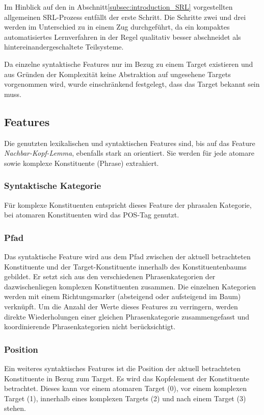 \documentclass[12pt]{article}
\begin{document}
Im Hinblick auf den in Abschnitt\ref{subsec:introduction_SRL} vorgestellten allgemeinen SRL-Prozess entfällt der erste Schritt. Die Schritte zwei und drei werden im Unterschied zu \cite{gildea} in einem Zug durchgeführt, da ein kompaktes automatisiertes Lernverfahren in der Regel qualitativ besser abschneidet als hintereinandergeschaltete Teilsysteme.

Da einzelne syntaktische Features nur im Bezug zu einem Target existieren und aus Gründen der Komplexität keine Abstraktion auf ungesehene Targets vorgenommen wird, wurde einschränkend festgelegt, dass das Target bekannt sein muss.

\subsection{Features}
Die genutzten lexikalischen und syntaktischen Features sind, bis auf das Feature \textit{Nachbar-Kopf-Lemma}, ebenfalls stark an \cite{gildea} orientiert. Sie werden für jede atomare sowie komplexe Konstituente (Phrase) extrahiert.

\subsubsection*{Syntaktische Kategorie}
Für komplexe Konstituenten entspricht dieses Feature der phrasalen Kategorie, bei atomaren Konstituenten wird das POS-Tag genutzt.
\subsubsection*{Pfad}
Das syntaktische Feature wird aus dem Pfad zwischen der aktuell betrachteten Konstituente und der Target-Konstituente innerhalb des Konstituentenbaums gebildet. Er setzt sich aus den verschiedenen Phrasenkategorien der dazwischenliegen komplexen Konstituenten zusammen. Die einzelnen Kategorien werden mit einem Richtungsmarker (absteigend oder aufsteigend im Baum) verknüpft. Um die Anzahl der Werte dieses Features zu verringern, werden direkte Wiederholungen einer gleichen Phrasenkategorie zusammengefasst und koordinierende Phrasenkategorien nicht berücksichtigt.
\subsubsection*{Position}
Ein weiteres syntaktisches Features ist die Position der aktuell betrachteten Konstituente in Bezug zum Target. Es wird das Kopfelement der Konstituente betrachtet. Dieses kann vor einem atomaren Target (0), vor einem komplexen Target (1), innerhalb eines komplexen Targets (2) und nach einem Target (3) stehen.
\end{document}
